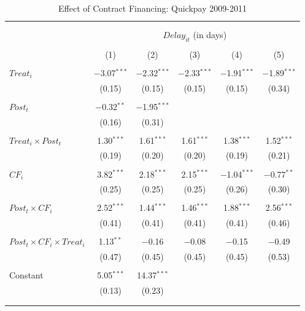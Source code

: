 \documentclass[
]{article}
\begin{document}
\begin{table}[H] \centering 
  \caption{Effect of Contract Financing: Quickpay 2009-2011} 
  \label{} 
\small 
\begin{tabular}{@{\extracolsep{-2pt}}lccccc} 
\\[-1.8ex]\hline 
\hline \\[-1.8ex] 
\\[-1.8ex] & \multicolumn{5}{c}{$Delay_{it}$ (in days)} \\ 
\\[-1.8ex] & (1) & (2) & (3) & (4) & (5)\\ 
\hline \\[-1.8ex] 
 $Treat_i$ & $-$3.07$^{***}$ & $-$2.32$^{***}$ & $-$2.33$^{***}$ & $-$1.91$^{***}$ & $-$1.89$^{***}$ \\ 
  & (0.15) & (0.15) & (0.15) & (0.15) & (0.34) \\ 
  & & & & & \\ 
 $Post_t$ & $-$0.32$^{**}$ & $-$1.95$^{***}$ &  &  &  \\ 
  & (0.16) & (0.31) &  &  &  \\ 
  & & & & & \\ 
 $Treat_i \times Post_t$ & 1.30$^{***}$ & 1.61$^{***}$ & 1.61$^{***}$ & 1.38$^{***}$ & 1.52$^{***}$ \\ 
  & (0.19) & (0.20) & (0.20) & (0.19) & (0.21) \\ 
  & & & & & \\ 
 $CF_i$ & 3.82$^{***}$ & 2.18$^{***}$ & 2.15$^{***}$ & $-$1.04$^{***}$ & $-$0.77$^{**}$ \\ 
  & (0.25) & (0.25) & (0.25) & (0.26) & (0.30) \\ 
  & & & & & \\ 
 $Post_t \times CF_i$ & 2.52$^{***}$ & 1.44$^{***}$ & 1.46$^{***}$ & 1.88$^{***}$ & 2.56$^{***}$ \\ 
  & (0.41) & (0.41) & (0.41) & (0.41) & (0.46) \\ 
  & & & & & \\ 
 $Post_t \times CF_i \times Treat_i$ & 1.13$^{**}$ & $-$0.16 & $-$0.08 & $-$0.15 & $-$0.49 \\ 
  & (0.47) & (0.45) & (0.45) & (0.45) & (0.53) \\ 
  & & & & & \\ 
 Constant & 5.05$^{***}$ & 14.37$^{***}$ &  &  &  \\ 
  & (0.13) & (0.23) &  &  &  \\ 
  & & & & & \\ 
\hline \\[-1.8ex] 

\end{tabular}
\end{table}
\end{document}

